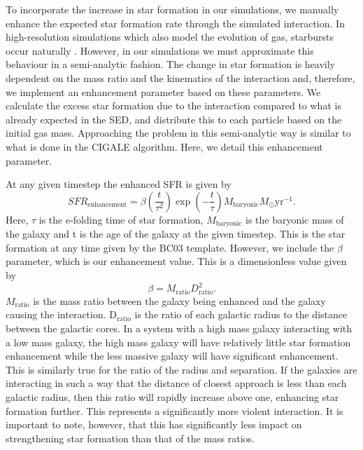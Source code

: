To incorporate the increase in star formation in our simulations, we manually enhance the expected star formation rate through the simulated interaction. In high-resolution simulations which also model the evolution of gas, starbursts occur naturally \citep{2009PASJ...61..481S}. However, in our simulations we must approximate this behaviour in a semi-analytic fashion. The change in star formation is heavily dependent on the mass ratio and the kinematics of the interaction and, therefore, we implement an enhancement parameter based on these parameters. We calculate the excess star formation due to the interaction compared to what is already expected in the SED, and distribute this to each particle based on the initial gas mass. Approaching the problem in this semi-analytic way is similar to what is done in the CIGALE \citep{2019A&A...622A.103B} algorithm. Here, we detail this enhancement parameter.

At any given timestep the enhanced SFR is given by
\begin{equation}\label{Total_SFR}
SFR_{\text{enhancement}} = \beta \left(\frac{t}{\tau^{2}}\right) \exp \left(-\frac{t}{\tau}\right) M_{\text{baryonic}} M_{\odot} \text{yr}^{-1}.
\end{equation}
Here, $\tau$ is the e-folding time of star formation, $M_{\text{baryonic}}$ is the baryonic mass of the galaxy and t is the age of the galaxy at the given timestep. This is the star formation at any time given by the BC03 template. However, we include the $\beta$ parameter, which is our enhancement value. This is a dimensionless value given by
\begin{equation}\label{enhancement_param}
\beta = M_{\text{ratio}} D_{\text{ratio}}^{2}.
\end{equation}
$M_{\text{ratio}}$ is the mass ratio between the galaxy being enhanced and the galaxy causing the interaction. D$_{\text{ratio}}$ is the ratio of each galactic radius to the distance between the galactic cores. In a system with a high mass galaxy interacting with a low mass galaxy, the high mass galaxy will have relatively little star formation enhancement while the less massive galaxy will have significant enhancement. This is similarly true for the ratio of the radius and separation. If the galaxies are interacting in such a way that the distance of closest approach is less than each galactic radius, then this ratio will rapidly increase above one, enhancing star formation further. This represents a significantly more violent interaction. It is important to note, however, that this has significantly less impact on strengthening star formation than that of the mass ratios. 

